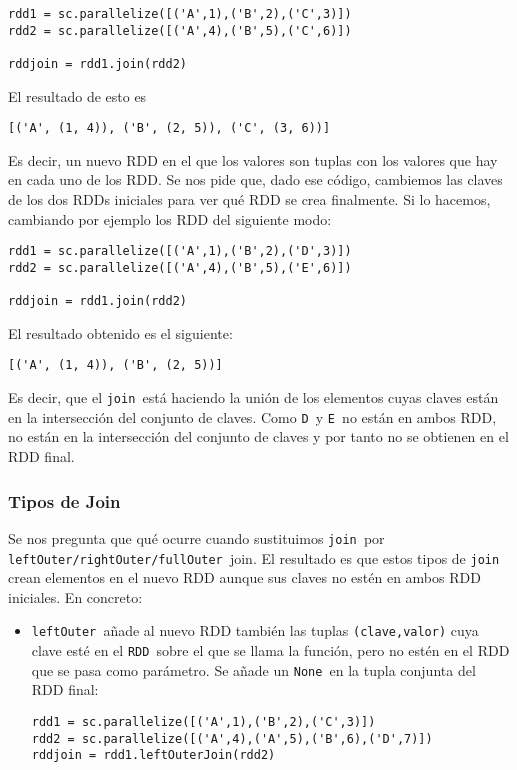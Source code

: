 \documentclass[11pt]{article}
\def\inline{\lstinline[basicstyle=\ttfamily,keywordstyle={}]}
\begin{document}
{{\begin{verbatim}
rdd1 = sc.parallelize([('A',1),('B',2),('C',3)])
rdd2 = sc.parallelize([('A',4),('B',5),('C',6)])

rddjoin = rdd1.join(rdd2)
\end{verbatim}

El resultado de esto es 
\begin{verbatim}
[('A', (1, 4)), ('B', (2, 5)), ('C', (3, 6))]
\end{verbatim}

Es decir, un nuevo RDD en el que los valores son tuplas con los valores que hay en cada uno de los RDD. Se nos pide que, dado ese código, cambiemos las claves de los dos RDDs iniciales para ver qué RDD se crea finalmente. Si lo hacemos, cambiando por ejemplo los RDD del siguiente modo:
\begin{verbatim}
rdd1 = sc.parallelize([('A',1),('B',2),('D',3)])
rdd2 = sc.parallelize([('A',4),('B',5),('E',6)])

rddjoin = rdd1.join(rdd2)
\end{verbatim}
El resultado obtenido es el siguiente:
\begin{verbatim}
[('A', (1, 4)), ('B', (2, 5))]
\end{verbatim}
Es decir, que el \inline{join }está haciendo la unión de los elementos cuyas claves están en la intersección del conjunto de claves. Como \inline{D }y \inline{E }no están en ambos RDD, no están en la intersección del conjunto de claves y por tanto no se obtienen en el RDD final.

\subsubsection*{ Tipos de Join }

Se nos pregunta que qué ocurre cuando sustituimos \inline{join }por \inline{leftOuter/rightOuter/fullOuter }join. El resultado es que estos tipos de \inline{join }crean elementos en el nuevo RDD aunque sus claves no estén en ambos RDD iniciales. En concreto:
\begin{itemize}
\item  \inline{leftOuter }añade al nuevo RDD también las tuplas  \inline{(clave,valor)} cuya clave esté en el \inline{RDD }sobre el que se llama la función, pero no estén en el RDD que se pasa como parámetro. Se añade un \inline{None }en la tupla conjunta del RDD final:
\begin{verbatim}
rdd1 = sc.parallelize([('A',1),('B',2),('C',3)])
rdd2 = sc.parallelize([('A',4),('A',5),('B',6),('D',7)])
rddjoin = rdd1.leftOuterJoin(rdd2)


\end{verbatim}
\end{itemize}}}
\end{document}
